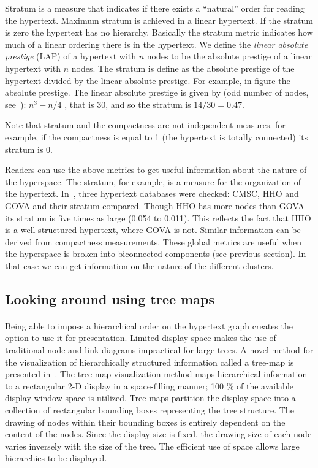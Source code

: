 \documentclass[twocolumn,10pt]{article}
\begin{document}
Stratum is a measure that indicates if there exists a ``natural'' order 
for reading the hypertext. Maximum stratum is achieved in a linear
hypertext. If the stratum is zero the hypertext has no
hierarchy. Basically
the stratum metric indicates how much of a linear ordering there
is in the hypertext.
We define the {\em linear absolute prestige} (LAP) of a hypertext  with $n$
nodes to be the absolute prestige of a linear hypertext with $ n$ 
nodes. The stratum is define as the absolute prestige of the hypertext
divided by the linear absolute prestige. For example, in figure
the absolute prestige. The linear absolute
prestige is given by (odd number of nodes, see~\cite{bot90}):
$n^{3} - n / 4$ , that is 30, and so the stratum is $ 14/30 = 0.47$.

Note that stratum and the compactness are not independent
measures. for example, if the compactness is equal to 1 (the
hypertext is totally connected) its stratum is 0.

Readers can use the above metrics to get useful information
about the nature of the hyperspace. The stratum, for example,
is a measure for the organization of the hypertext. In~\cite{bot90},
three hypertext databases were checked: CMSC, HHO and GOVA and
their stratum compared. Though HHO has more nodes than GOVA its
stratum is five times as large (0.054 to 0.011). This reflects the 
fact that HHO is
a well structured hypertext, where GOVA is not. Similar information
can be derived from compactness measurements. These global metrics
are useful when the hyperspace is broken into biconnected components
(see previous section). In that case we can get information on the nature
of the different clusters.

\subsection*{Looking around using tree maps}
\paragraph{}
Being able to impose a hierarchical order on the hypertext graph
creates the option to use it for presentation. 
Limited display space makes the use of traditional node and link
diagrams impractical for large trees.
A novel method for the visualization
of hierarchically structured information called a tree-map is 
presented in~\cite{shne90,bb}. The tree-map visualization
method maps hierarchical information to a rectangular 2-D display
in a space-filling manner; 100 \% of the available display window space
is utilized.
Tree-maps partition the
display space into a collection of rectangular bounding boxes
representing the tree structure. The drawing of nodes within their bounding
boxes is entirely dependent on the content of the nodes.
Since the display size is fixed,
the drawing size of each node varies inversely with the size of the tree.
The efficient use of space allows large hierarchies to be displayed.
\end{document}
